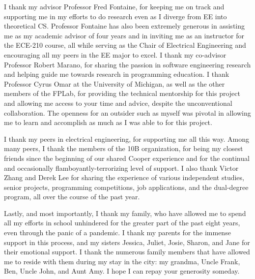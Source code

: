 
\noindent{}I thank my advisor Professor Fred Fontaine, for keeping me on track and supporting me in my efforts to do research even as I diverge from EE into theoretical CS. Professor Fontaine has also been extremely generous in assisting me as my academic advisor of four years and in inviting me as an instructor for the ECE-210 course, all while serving as the Chair of Electrical Engineering and encouraging all my peers in the EE major to excel. I thank my co-advisor Professor Robert Marano, for sharing the passion in software engineering research and helping guide me towards research in programming education. I thank Professor Cyrus Omar at the University of Michigan, as well as the other members of the FPLab, for providing the technical mentorship for this project and allowing me access to your time and advice, despite the unconventional collaboration. The openness for an outsider such as myself was pivotal in allowing me to learn and accomplish as much as I was able to for this project.

I thank my peers in electrical engineering, for supporting me all this way. Among many peers, I thank the members of the 10B organization, for being my closest friends since the beginning of our shared Cooper experience and for the continual and occasionally flamboyantly-terrorizing level of support. I also thank Victor Zhang and Derek Lee for sharing the experience of various independent studies, senior projects, programming competitions, job applications, and the dual-degree program, all over the course of the past year.

Lastly, and most importantly, I thank my family, who have allowed me to spend all my efforts in school unhindered for the greater part of the past eight years, even through the panic of a pandemic. I thank my parents for the immense support in this process, and my sisters Jessica, Juliet, Josie, Sharon, and Jane for their emotional support. I thank the numerous family members that have allowed me to reside with them during my stay in the city: my grandma, Uncle Frank, Ben, Uncle John, and Aunt Amy. I hope I can repay your generosity someday.

